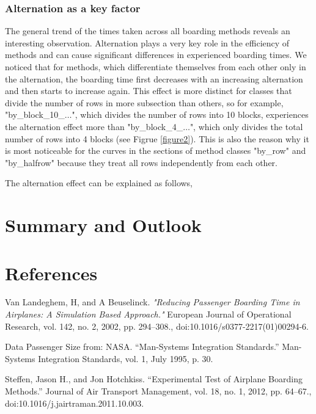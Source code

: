 \documentclass[11pt]{article}
\begin{document}
 \subsubsection{Alternation as a key factor}
 The general trend of the times taken across all boarding methods reveals an interesting observation. Alternation plays a very key role in the efficiency of methods and can cause significant differences in experienced boarding times. We noticed that for methods, which differentiate themselves from each other only in the alternation, the boarding time first decreases with an increasing alternation and then starts to increase again.
 This effect is more distinct for classes that divide the number of rows in more subsection than others, so for example, "by\_block\_10\_$\dots$", which divides the number of rows into 10 blocks, experiences the alternation effect more than "by\_block\_4\_$\dots$", which only divides the total number of rows into 4 blocks (see Figrue \ref{figure2}).  This is also the reason why it is most noticeable for the curves in the sections of method classes "by\_row" and "by\_halfrow" because they treat all rows independently from each other. 
 
 The alternation effect can be explained as follows, 
 

\section{Summary and Outlook}

\section{References}
\begin{thebibliography}{9}
	Van Landeghem, H, and A Beuselinck. 
	\textit{"Reducing Passenger Boarding Time in Airplanes: A Simulation Based Approach."} 
	European Journal of Operational Research, vol. 142, no. 2, 2002, pp. 294–308.,
	doi:10.1016/s0377-2217(01)00294-6.
	
	Data Passenger Size from:  NASA. “Man-Systems Integration Standards.” Man-Systems Integration Standards, vol. 1, July 1995, p. 30.
	
	Steffen, Jason H., and Jon Hotchkiss. “Experimental Test of Airplane Boarding Methods.” Journal of Air Transport Management, vol. 18, no. 1, 2012, pp. 64–67., doi:10.1016/j.jairtraman.2011.10.003.
\end{thebibliography}
\end{document}
